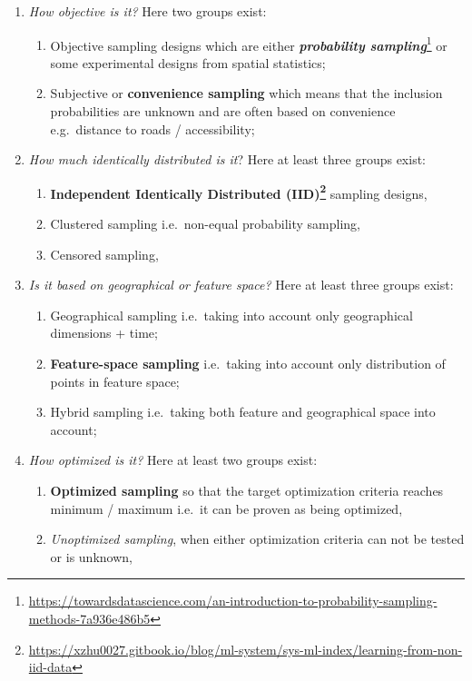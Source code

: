 \documentclass[
  graybox,natbib,nospthms]{svmono}
\renewcommand{\href}[2]{#2 (\url{#1})}
\renewcommand{\href}[2]{#2\footnote{\url{#1}}}
\begin{document}
\begin{enumerate}
\def\labelenumi{\arabic{enumi}.}
\item
  \emph{How objective is it?} Here two groups exist:

  \begin{enumerate}
  \def\labelenumii{\alph{enumii}.}
  \item
    Objective sampling designs which are either \href{https://towardsdatascience.com/an-introduction-to-probability-sampling-methods-7a936e486b5}{\textbf{\emph{probability
    sampling}}}
    or some experimental designs from spatial statistics;
  \item
    Subjective or \textbf{convenience sampling} which means that the
    inclusion probabilities are unknown and are often based on
    convenience e.g.~distance to roads / accessibility;
  \end{enumerate}
\item
  \emph{How much identically distributed is it}? Here at least three groups
  exist:

  \begin{enumerate}
  \def\labelenumii{\alph{enumii}.}
  \item
    \textbf{\href{https://xzhu0027.gitbook.io/blog/ml-system/sys-ml-index/learning-from-non-iid-data}{Independent Identically Distributed (IID)}}
    sampling designs,
  \item
    Clustered sampling i.e.~non-equal probability sampling,
  \item
    Censored sampling,
  \end{enumerate}
\item
  \emph{Is it based on geographical or feature space?} Here at least three
  groups exist:

  \begin{enumerate}
  \def\labelenumii{\alph{enumii}.}
  \item
    Geographical sampling i.e.~taking into account only geographical dimensions + time;
  \item
    \textbf{Feature-space sampling} i.e.~taking into account only distribution of points in feature space;
  \item
    Hybrid sampling i.e.~taking both feature and geographical space into account;
  \end{enumerate}
\item
  \emph{How optimized is it?} Here at least two groups exist:

  \begin{enumerate}
  \def\labelenumii{\alph{enumii}.}
  \item
    \textbf{Optimized sampling} so that the target optimization criteria
    reaches minimum / maximum i.e.~it can be proven as being optimized,
  \item
    \emph{Unoptimized sampling}, when either optimization criteria can not be tested or is unknown,
  \end{enumerate}
\end{enumerate}
\end{document}
